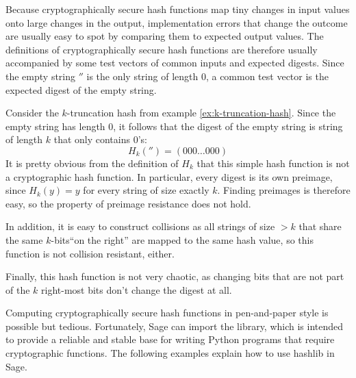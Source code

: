 Because cryptographically secure hash functions map tiny changes in input values onto large changes in the output, implementation errors that change the outcome are usually easy to spot by comparing them to expected output values. The definitions of cryptographically secure hash functions are therefore usually accompanied by some test vectors of common inputs and expected digests. Since the empty string $''$ is the only string of length $0$, a common test vector is the expected digest of the empty string.
\begin{example} Consider the $k$-truncation hash from example \ref{ex:k-truncation-hash}. Since the empty string has length $0$, it follows that the digest of the empty string is string of length $k$ that only contains $0$'s:
\begin{equation}
H_k('')= (000\ldots 000)
\end{equation}
It is pretty obvious from the definition of $H_k$ that this simple hash function is not a cryptographic hash function. In particular, every digest is its own preimage, since $H_k(y)=y$ for every string of size exactly $k$. Finding preimages is therefore easy, so the property of preimage resistance does not hold.

In addition, it is easy to construct collisions as all strings of size $>k$ that share the same $k$-bits``on the right'' are mapped to the same hash value, so this function is not collision resistant, either.

Finally, this hash function is not very chaotic, as changing bits that are not part of the $k$ right-most bits don't change the digest at all.
\end{example}
Computing cryptographically secure hash functions in pen-and-paper style is possible but tedious. Fortunately, Sage can import the  library, which is intended to provide a reliable and stable base for writing Python programs that require cryptographic functions. The following examples explain how to use hashlib in Sage.
